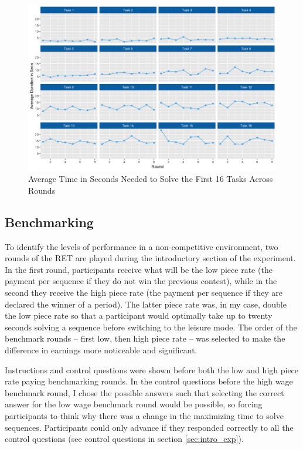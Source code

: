     \begin{figure}[h]
        \centering
        \includegraphics[width = \textwidth]{graphs/avg_time_per_task_round.png}
        \caption{Average Time in Seconds Needed to Solve the First 16 Tasks Across Rounds}
        \label{fig:avg_time_task}
    \end{figure}
    
    
    \subsection{Benchmarking}
    \label{ss:benchmarking}
    
    To identify the levels of performance in a non-competitive environment, two rounds of the RET are played during the introductory section of the experiment. In the first round, participants receive what will be the low piece rate (the payment per sequence if they do not win the previous contest), while in the second they receive the high piece rate (the payment per sequence if they are declared the winner of a period). The latter piece rate was, in my case, double the low piece rate so that a participant would optimally take up to twenty seconds solving a sequence before switching to the leisure mode. The order of the benchmark rounds -- first low, then high piece rate -- was selected to make the difference in earnings more noticeable and significant.
    
    Instructions and control questions were shown before both the low and high piece rate paying benchmarking rounds. In the control questions before the high wage benchmark round, I chose the possible answers such that selecting the correct answer for the low wage benchmark round would be possible, so forcing participants to think why there was a change in the maximizing time to solve sequences. Participants could only advance if they responded correctly to all the control questions (see control questions in section \ref{sec:intro_exp}).
    
